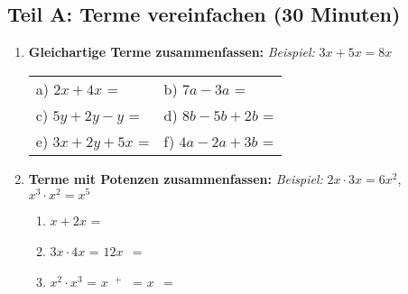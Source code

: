 \subsection*{Teil A: Terme vereinfachen (30 Minuten)}

\begin{enumerate}[label=\arabic*.]

    \item \textbf{Gleichartige Terme zusammenfassen:}
    \textit{Beispiel:} $3x + 5x = 8x$
    \vspace{0.5cm}

    \begin{tabular}{ll}
        a) $2x + 4x$ = \underline{\hspace{3cm}} & b) $7a - 3a$ = \underline{\hspace{3cm}} \\[3ex]
        c) $5y + 2y - y$ = \underline{\hspace{3cm}} & d) $8b - 5b + 2b$ = \underline{\hspace{3cm}} \\[3ex]
        e) $3x + 2y + 5x$ = \underline{\hspace{3cm}} & f) $4a - 2a + 3b$ = \underline{\hspace{3cm}}
    \end{tabular}

    \vspace{1cm}

    \item \textbf{Terme mit Potenzen zusammenfassen:}
    \textit{Beispiel:} $2x \cdot 3x = 6x^2$, $x^3 \cdot x^2 = x^5$
    \vspace{0.5cm}

    \begin{enumerate}[label=\alph*)]
        \item $x + 2x$ = \underline{\hspace{3cm}}
        \vspace{0.5cm}

        \item $3x \cdot 4x$ = $12x^{\phantom{0}}$ = \underline{\hspace{3cm}}
        \vspace{0.5cm}

        \item $x^2 \cdot x^3$ = $x^{\phantom{0}+\phantom{0}}$ = $x^{\phantom{0}}$ = \underline{\hspace{3cm}}
        \vspace{0.5cm}


\end{enumerate}
\end{enumerate}
